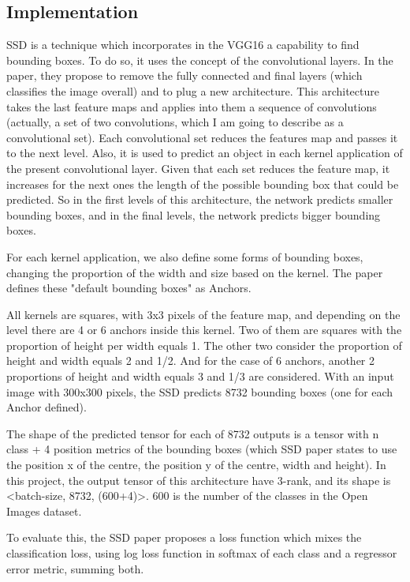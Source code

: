 \documentclass[11pt, a4paper, twocolumn]{article}
\begin{document}
\subsection{Implementation}

SSD is a technique which incorporates in the VGG16 a capability to find bounding boxes. To do so, it uses the concept of the convolutional layers. In the paper, they propose to remove the fully connected and final layers (which classifies the image overall) and to plug a new architecture. This architecture takes the last feature maps and applies into them a sequence of convolutions (actually, a set of two convolutions, which I am going to describe as a convolutional set). Each convolutional set reduces the features map and passes it to the next level. Also, it is used to predict an object in each kernel application of the present convolutional layer. Given that each set reduces the feature map, it increases for the next ones the length of the possible bounding box that could be predicted. So in the first levels of this architecture, the network predicts smaller bounding boxes, and in the final levels, the network predicts bigger bounding boxes.

For each kernel application, we also define some forms of bounding boxes, changing the proportion of the width and size based on the kernel. The paper defines these "default bounding boxes" as Anchors.

All kernels are squares, with 3x3 pixels of the feature map, and depending on the level there are 4 or 6 anchors inside this kernel. Two of them are squares with the proportion of height per width equals 1. The other two consider the proportion of height and width equals 2 and 1/2. And for the case of 6 anchors, another 2 proportions of height and width equals 3 and 1/3 are considered. With an input image with 300x300 pixels, the SSD predicts 8732 bounding boxes (one for each Anchor defined).

The shape of the predicted tensor for each of 8732 outputs is a tensor with n class + 4 position metrics of the bounding boxes (which SSD paper states to use the position x of the centre, the position y of the centre, width and height). In this project, the output tensor of this architecture have 3-rank, and its shape is <batch-size, 8732, (600+4)>. 600 is the number of the classes in the Open Images dataset.

To evaluate this, the SSD paper proposes a loss function which mixes the classification loss, using log loss function in softmax of each class and a regressor error metric, summing both.
\end{document}
